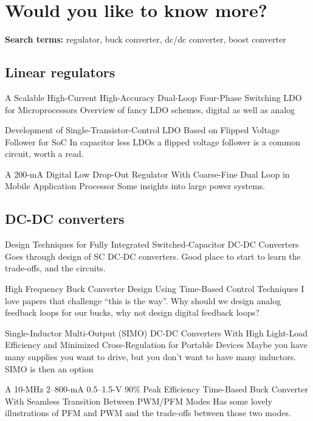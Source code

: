 \section{Would you like to know
more?}\label{would-you-like-to-know-more}

\textbf{Search terms:} regulator, buck converter, dc/dc converter, boost
converter

\subsection{Linear regulators}\label{linear-regulators-1}

A Scalable High-Current High-Accuracy Dual-Loop Four-Phase Switching LDO
for Microprocessors  Overview of fancy LDO
schemes, digital as well as analog

Development of Single-Transistor-Control LDO Based on Flipped Voltage
Follower for SoC  In capacitor less LDOs a
flipped voltage follower is a common circuit, worth a read.

A 200-mA Digital Low Drop-Out Regulator With Coarse-Fine Dual Loop in
Mobile Application Processor  Some insights
into large power systems.

\subsection{DC-DC converters}\label{dc-dc-converters}

Design Techniques for Fully Integrated Switched-Capacitor DC-DC
Converters  Goes through design of SC DC-DC
converters. Good place to start to learn the trade-offs, and the
circuits.

High Frequency Buck Converter Design Using Time-Based Control Techniques
 I love papers that challenge ``this is the
way''. Why should we design analog feedback loops for our bucks, why not
design digital feedback loops?

Single-Inductor Multi-Output (SIMO) DC-DC Converters With High
Light-Load Efficiency and Minimized Cross-Regulation for Portable
Devices  Maybe you have many supplies
you want to drive, but you don't want to have many inductors. SIMO is
then an option

A 10-MHz 2--800-mA 0.5--1.5-V 90\% Peak Efficiency Time-Based Buck
Converter With Seamless Transition Between PWM/PFM Modes
 Has some lovely illustrations of PFM and
PWM and the trade-offs between those two modes.

